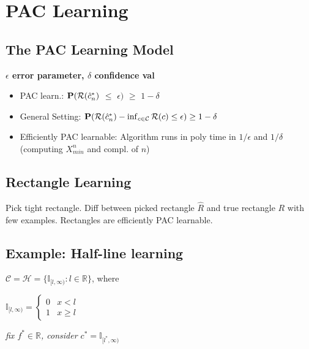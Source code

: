 \section{PAC Learning}



\subsection{The PAC Learning Model}
\textbf{$\epsilon$ error parameter, $\delta$ confidence val}
\begin{itemize}
	\item PAC learn.: $
			\P(\mathcal R(\hat{c}_n^*)$ $\leq$ $\epsilon)$ $\geq$ $1 -\delta
		$
		
		\item General Setting: 
		$
			\P(\mathcal R(\hat{c}_n^*) - \inf_{c\in \mathcal C} \mathcal R(c) \leq \epsilon) \geq 1 - \delta
		$
	\item Efficiently PAC learnable: Algorithm runs in poly time in $1/\epsilon$ and $1/\delta$ (computing $X_{\textit{min}}^n$ and compl. of $n$)
\end{itemize}






\subsection{Rectangle Learning}
Pick tight rectangle. Diff between picked rectangle $\hat R$ and true rectangle $R$ with few examples. Rectangles are efficiently PAC learnable.


\subsection{Example: Half-line learning}
$\mathcal C = \mathcal H = \{\mathbb I_{[l, \infty)} : l\in \mathbb R\}$, where 
\begin{minipage}{\columnwidth}
	\begin{minipage}{0.5\columnwidth}
		$\mathbb I_{[l, \infty)} = 
		\begin{cases}
			0 & x < l \\
			1 & x \geq l
		\end{cases}
		$
	\end{minipage}
	\begin{minipage}{0.45\columnwidth}
		\textit{fix $f^*\in \mathbb R$, consider $c^* = \mathbb I_{[l^*, \infty)}$}
	\end{minipage}
\end{minipage}

